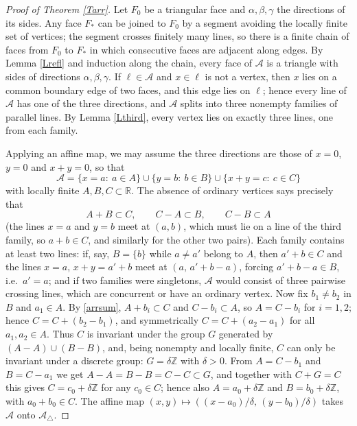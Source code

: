\documentclass{article}
\def\R{{\mathbb R}}
\def\Z{{\mathbb Z}}
\begin{document}
	\begin{proof}[Proof of Theorem \ref{Tarr}]
		Let $F_0$ be a triangular face and $\alpha,\beta,\gamma$ the directions of its sides. Any face $F_*$ can be joined to $F_0$ by a segment avoiding the locally finite set of vertices; the segment crosses finitely many lines, so there is a finite chain of faces from $F_0$ to $F_*$ in which consecutive faces are adjacent along edges. By Lemma \ref{Lrefl} and induction along the chain, every face of $\mathcal A$ is a triangle with sides of directions $\alpha,\beta,\gamma$. If $\ell\in\mathcal A$ and $x\in\ell$ is not a vertex, then $x$ lies on a common boundary edge of two faces, and this edge lies on $\ell$; hence every line of $\mathcal A$ has one of the three directions, and $\mathcal A$ splits into three nonempty families of parallel lines. By Lemma \ref{Lthird}, every vertex lies on exactly three lines, one from each family.

		Applying an affine map, we may assume the three directions are those of $x=0$, $y=0$ and $x+y=0$, so that
		$$\mathcal A=\{x=a:\ a\in A\}\cup\{y=b:\ b\in B\}\cup\{x+y=c:\ c\in C\}$$
		with locally finite $A,B,C\subset\R$. The absence of ordinary vertices says precisely that
		\begin{equation}\label{arrsum}
			A+B\subset C,\qquad C-A\subset B,\qquad C-B\subset A
		\end{equation}
		(the lines $x=a$ and $y=b$ meet at $(a,b)$, which must lie on a line of the third family, so $a+b\in C$, and similarly for the other two pairs). Each family contains at least two lines: if, say, $B=\{b\}$ while $a\neq a'$ belong to $A$, then $a'+b\in C$ and the lines $x=a$, $x+y=a'+b$ meet at $(a,\,a'+b-a)$, forcing $a'+b-a\in B$, i.e.\ $a'=a$; and if two families were singletons, $\mathcal A$ would consist of three pairwise crossing lines, which are concurrent or have an ordinary vertex. Now fix $b_1\neq b_2$ in $B$ and $a_1\in A$. By \eqref{arrsum}, $A+b_i\subset C$ and $C-b_i\subset A$, so $A=C-b_i$ for $i=1,2$; hence $C=C+(b_2-b_1)$, and symmetrically $C=C+(a_2-a_1)$ for all $a_1,a_2\in A$. Thus $C$ is invariant under the group $G$ generated by $(A-A)\cup(B-B)$, and, being nonempty and locally finite, $C$ can only be invariant under a discrete group: $G=\delta\Z$ with $\delta>0$. From $A=C-b_1$ and $B=C-a_1$ we get $A-A=B-B=C-C\subset G$, and together with $C+G=C$ this gives $C=c_0+\delta\Z$ for any $c_0\in C$; hence also $A=a_0+\delta\Z$ and $B=b_0+\delta\Z$, with $a_0+b_0\in C$. The affine map $(x,y)\mapsto((x-a_0)/\delta,\,(y-b_0)/\delta)$ takes $\mathcal A$ onto $\mathcal A_\triangle$.
	\end{proof}
\end{document}
